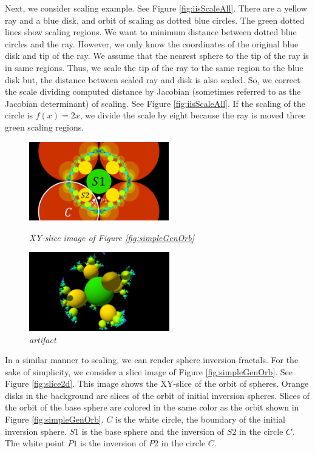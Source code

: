 Next, we consider scaling example.
See Figure \ref{fig:iisScaleAll}.
There are a yellow ray and a blue disk, and orbit of scaling as
dotted blue circles.
The green dotted lines show scaling regions.
We want to minimum distance between dotted blue circles and the ray.
However, we only know the coordinates of the original blue
disk and tip of the ray.
We assume that the nearest sphere to the tip of the ray is in
same regions. 
Thus, we scale the tip of the ray to the same region to the blue disk
but, the distance between scaled ray and disk is also scaled.
So, we correct the scale dividing computed distance by 
Jacobian (sometimes referred to as the Jacobian determinant) of scaling.
See Figure \ref{fig:iisScaleAll}.
If the scaling of the circle is $f(x) = 2x$, we divide the scale by
eight because the ray is moved three green scaling regions.

\begin{figure}[htbp]
 \begin{minipage}[t]{0.5\hsize}
  \center
  \includegraphics[height=1.35in, keepaspectratio]{img/preparation/slice.png}
  \caption{\textit{XY-slice image of Figure \ref{fig:simpleGenOrb}}}
  \label{fig:slice2d}
  \hspace*{\fill}
 \end{minipage}
 \begin{minipage}[t]{0.5\hsize}
  \center
  \includegraphics[height=1.35in, keepaspectratio]{img/preparation/artifact.pdf}
  \caption{\textit{artifact}}
  \label{fig:3dartifact}
  \hspace*{\fill}
 \end{minipage}
\end{figure}

In a similar manner to scaling, we can render sphere inversion
fractals.
For the sake of simplicity, we consider a slice image of Figure
\ref{fig:simpleGenOrb}.
See Figure \ref{fig:slice2d}. This image shows the XY-slice of the orbit
of spheres.
Orange disks in the background are slices of the orbit of initial inversion spheres.
Slices of the orbit of the base sphere are colored in
the same color as the orbit shown in Figure \ref{fig:simpleGenOrb}.
$C$ is the white circle, the boundary of the initial inversion sphere.
$S1$ is the base sphere and the inversion of $S2$ in the circle $C$. 
The white point $P1$ is the inversion of $P2$ in the circle $C$.

